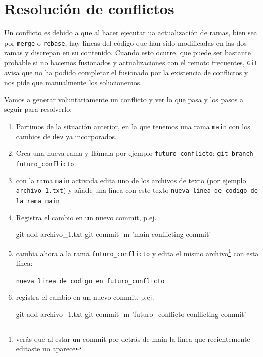 \documentclass[a4paper,11pt]{report}
\newcommand{\cverb}{\Verb}
\begin{document}
  \section{Resolución de conflictos}
    Un conflicto es debido a que al hacer ejecutar ua actualización de ramas, bien sea por \verb+merge+ o \verb+rebase+, hay líneas del código que han sido modificadas en las dos ramas y discrepan en su contenido. Cuando esto ocurre, que puede ser bastante probable si no hacemos fusionados y actualizaciones con el remoto frecuentes, \verb+Git+ avisa que no ha podido completar el fusionado por la existencia de conflictos y nos pide que manualmente los solucionemos.
    
    Vamos a generar voluntariamente un conflicto y ver lo que pasa y los pasos a seguir para resolverlo:
    \begin{enumerate}
     \item Partimos de la situación anterior, en la que tenemos una rama \verb+main+ con los cambios de \verb+dev+ ya incorporados.
     
     \item Crea una nueva rama y llámala por ejemplo \verb+futuro_conflicto+:
     \cverb+git branch futuro_conflicto+
     
     \item con la rama \verb+main+ activada edita uno de los archivos de texto (por ejemplo \verb+archivo_1.txt+) y añade una línea con este texto
     \cverb+nueva linea de codigo de la rama main+
     
     \item Registra el cambio en un nuevo commit, p.ej.
     \begin{cverbatim}
git add archivo_1.txt
git commit -m 'main conflicting commit'
     \end{cverbatim}

     \item cambia ahora a la rama \verb+futuro_conflicto+ y edita el mismo archivo\footnote{verás que al estar un commit por detrás de main la linea que recientemente editaste no aparece} con esta línea:
     
     \cverb+nueva linea de codigo en futuro_conflicto+
     
     \item registra el cambio en un nuevo commit, p.ej.
     \begin{cverbatim}
git add archivo_1.txt
git commit -m 'futuro_conflicto conflicting commit'
     \end{cverbatim}
     

\end{enumerate}
\end{document}
